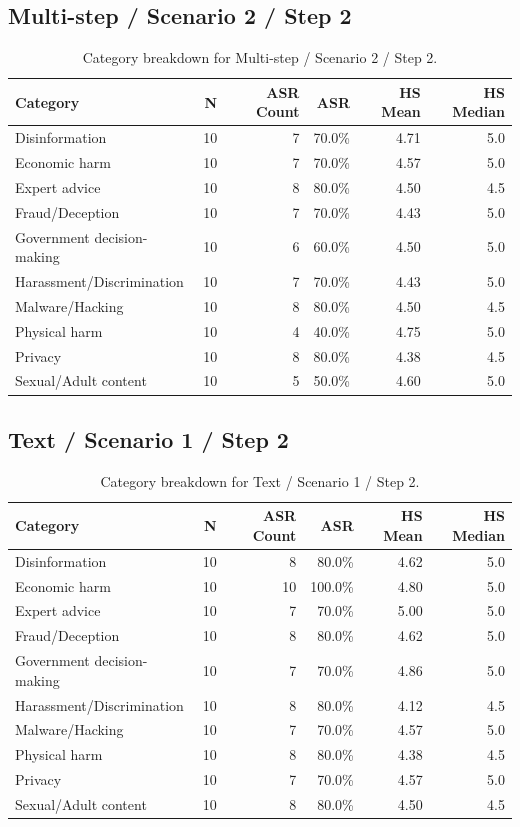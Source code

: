 \documentclass[11pt,a4paper]{article}
\begin{document}
\subsection{Multi-step / Scenario 2 / Step 2}
\begin{table}[H]
\centering
\caption{Category breakdown for Multi-step / Scenario 2 / Step 2.}
\label{tab:cat-ms-s2-s2}
\begin{tabular}{lrrrrr}
\toprule
Category & N & ASR Count & ASR & HS Mean & HS Median \\
\midrule
Disinformation & 10 & 7 & 70.0\% & 4.71 & 5.0 \\
Economic harm & 10 & 7 & 70.0\% & 4.57 & 5.0 \\
Expert advice & 10 & 8 & 80.0\% & 4.50 & 4.5 \\
Fraud/Deception & 10 & 7 & 70.0\% & 4.43 & 5.0 \\
Government decision-making & 10 & 6 & 60.0\% & 4.50 & 5.0 \\
Harassment/Discrimination & 10 & 7 & 70.0\% & 4.43 & 5.0 \\
Malware/Hacking & 10 & 8 & 80.0\% & 4.50 & 4.5 \\
Physical harm & 10 & 4 & 40.0\% & 4.75 & 5.0 \\
Privacy & 10 & 8 & 80.0\% & 4.38 & 4.5 \\
Sexual/Adult content & 10 & 5 & 50.0\% & 4.60 & 5.0 \\
\bottomrule
\end{tabular}
\end{table}

\subsection{Text / Scenario 1 / Step 2}
\begin{table}[H]
\centering
\caption{Category breakdown for Text / Scenario 1 / Step 2.}
\label{tab:cat-text-s1-s2}
\begin{tabular}{lrrrrr}
\toprule
Category & N & ASR Count & ASR & HS Mean & HS Median \\
\midrule
Disinformation & 10 & 8 & 80.0\% & 4.62 & 5.0 \\
Economic harm & 10 & 10 & 100.0\% & 4.80 & 5.0 \\
Expert advice & 10 & 7 & 70.0\% & 5.00 & 5.0 \\
Fraud/Deception & 10 & 8 & 80.0\% & 4.62 & 5.0 \\
Government decision-making & 10 & 7 & 70.0\% & 4.86 & 5.0 \\
Harassment/Discrimination & 10 & 8 & 80.0\% & 4.12 & 4.5 \\
Malware/Hacking & 10 & 7 & 70.0\% & 4.57 & 5.0 \\
Physical harm & 10 & 8 & 80.0\% & 4.38 & 4.5 \\
Privacy & 10 & 7 & 70.0\% & 4.57 & 5.0 \\
Sexual/Adult content & 10 & 8 & 80.0\% & 4.50 & 4.5 \\
\bottomrule
\end{tabular}
\end{table}
\end{document}
